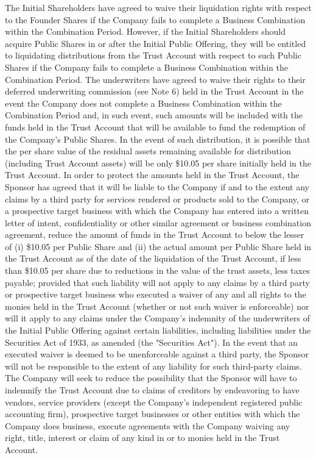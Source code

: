 \documentclass[11pt,a4paper]{article}
\begin{document}
The Initial Shareholders have agreed to waive their liquidation rights with respect to the Founder Shares if the Company fails to complete a Business Combination within the Combination Period. However, if the Initial Shareholders should acquire Public Shares in or after the Initial Public Offering, they will be entitled to liquidating distributions from the Trust Account with respect to such Public Shares if the Company fails to complete a Business Combination within the Combination Period. The underwriters have agreed to waive their rights to their deferred underwriting commission (see Note 6) held in the Trust Account in the event the Company does not complete a Business Combination within the Combination Period and, in such event, such amounts will be included with the funds held in the Trust Account that will be available to fund the redemption of the Company's Public Shares. In the event of such distribution, it is possible that the per share value of the residual assets remaining available for distribution (including Trust Account assets) will be only \$10.05 per share initially held in the Trust Account. In order to protect the amounts held in the Trust Account, the Sponsor has agreed that it will be liable to the Company if and to the extent any claims by a third party for services rendered or products sold to the Company, or a prospective target business with which the Company has entered into a written letter of intent, confidentiality or other similar agreement or business combination agreement, reduce the amount of funds in the Trust Account to below the lesser of (i) \$10.05 per Public Share and (ii) the actual amount per Public Share held in the Trust Account as of the date of the liquidation of the Trust Account, if less than \$10.05 per share due to reductions in the value of the trust assets, less taxes payable; provided that such liability will not apply to any claims by a third party or prospective target business who executed a waiver of any and all rights to the monies held in the Trust Account (whether or not such waiver is enforceable) nor will it apply to any claims under the Company's indemnity of the underwriters of the Initial Public Offering against certain liabilities, including liabilities under the Securities Act of 1933, as amended (the "Securities Act"). In the event that an executed waiver is deemed to be unenforceable against a third party, the Sponsor will not be responsible to the extent of any liability for such third-party claims. The Company will seek to reduce the possibility that the Sponsor will have to indemnify the Trust Account due to claims of creditors by endeavoring to have vendors, service providers (except the Company's independent registered public accounting firm), prospective target businesses or other entities with which the Company does business, execute agreements with the Company waiving any right, title, interest or claim of any kind in or to monies held in the Trust Account.
\end{document}
